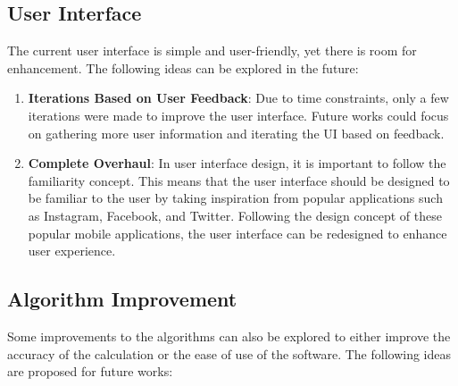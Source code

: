 \subsection{User Interface}

The current user interface is simple and user-friendly, yet there is room for enhancement. The following ideas can be explored in the future:

\begin{enumerate}
    \item \textbf{Iterations Based on User Feedback}: Due to time constraints, only a few iterations were made to improve the user interface. Future works could focus on gathering more user information and iterating the UI based on feedback.
    \item \textbf{Complete Overhaul}: In user interface design, it is important to follow the familiarity concept. This means that the user interface should be designed to be familiar to the user by taking inspiration from popular applications such as Instagram, Facebook, and Twitter. Following the design concept of these popular mobile applications, the user interface can be redesigned to enhance user experience.
\end{enumerate}

\subsection{Algorithm Improvement}
Some improvements to the algorithms can also be explored to either improve the accuracy of the calculation or the ease of use of the software. The following ideas are proposed for future works:

